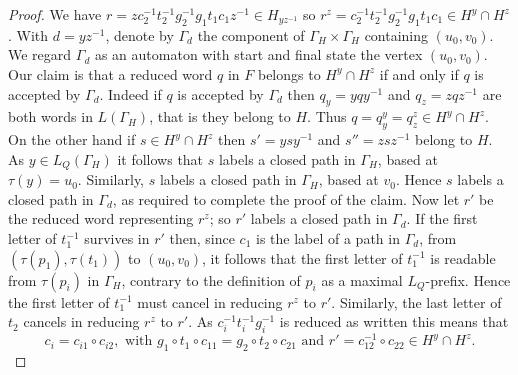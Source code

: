 \documentclass[a4paper,12pt]{article}
\newcommand{\G}{\Gamma }
\renewcommand{\t}{\tau }
\numberwithin{equation}{section}
\numberwithin{figure}{section}
\begin{document}
{\begin{proof}
We have $r=zc_2^{-1}t_2^{-1}g_2^{-1}g_1t_1c_1z^{-1}\in H_{yz^{-1}}$ so $r^z=c_2^{-1}t_2^{-1}g_2^{-1}g_1t_1c_1 \in H^y\cap H^z$. 
With $d=yz^{-1}$, denote by $\G_d$ the component of $\G_H\times \G_H$ containing $(u_0,v_0)$. We regard $\G_d$ as an automaton
with start and final state the vertex $(u_0,v_0)$. 
Our claim is that  a reduced word $q$ in $F$ belongs to $H^y\cap H^z$ if and only if $q$ is accepted by $\G_d$. 
Indeed if $q$ is accepted by $\G_{d}$ then $q_y=yqy^{-1}$ and 
$q_z=zqz^{-1}$ are both words in $L(\G_H)$, that is they belong to $H$. Thus $q=q_y^y=q_z^z\in H^y\cap H^z$. On the other
hand if $s\in H^y\cap H^z$ then $s'=ysy^{-1}$ and $s''=zsz^{-1}$ belong to $H$. As $y\in L_Q(\G_H)$ it follows that 
$s$ labels a closed path in $\G_H$, based at $\t(y)=u_0$. Similarly, $s$ labels a closed path in $\G_H$, based at $v_0$. 
Hence $s$ labels a closed path in  $\G_d$, as required to complete the proof of the claim. 
Now let $r'$ be the reduced word representing $r^z$; so $r'$ labels a closed path in $\G_d$. If the first letter of $t_1^{-1}$
survives in $r'$ then, since $c_1$ is the label of a path in $\G_d$, from $(\t(p_1),\t(t_1))$ to $(u_0,v_0)$, it follows that
the first letter of $t_1^{-1}$ is readable from $\t(p_i)$ in $\G_H$, contrary to the definition of $p_i$ as a 
maximal $L_Q$-prefix. Hence the first letter of $t_1^{-1}$ must cancel in reducing $r^z$ to $r'$. Similarly, the last letter
of $t_2$ cancels in reducing $r^z$ to $r'$. As    $c_i^{-1}t_i^{-1}g_i^{-1}$ is reduced as written this means that 
\begin{equation}\label{eq:findtr}
c_i=c_{i1}\circ c_{i2},  \textrm{ with }g_1\circ t_1\circ c_{11}=g_2\circ t_2\circ c_{21}\textrm{ and }r'=c_{12}^{-1}\circ c_{22}\in H^y\cap H^z.
\end{equation}


\end{proof}}
\end{document}
